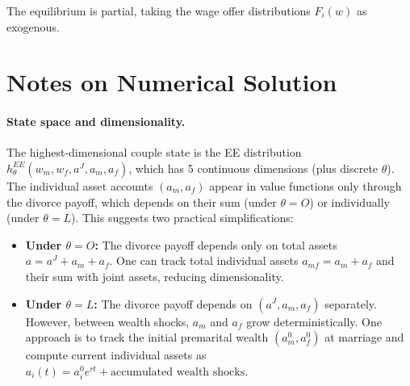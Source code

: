 \documentclass[11pt]{article}
\newcommand{\aJ}{a^{J}}
\begin{document}
The equilibrium is partial, taking the wage offer distributions $F_i(w)$ as exogenous.


\section{Notes on Numerical Solution}

\paragraph{State space and dimensionality.} The highest-dimensional couple state is the EE distribution $h_\theta^{EE}(w_m, w_f, \aJ, a_m, a_f)$, which has 5 continuous dimensions (plus discrete $\theta$). The individual asset accounts $(a_m, a_f)$ appear in value functions only through the divorce payoff, which depends on their sum (under $\theta=O$) or individually (under $\theta=L$). This suggests two practical simplifications:
\begin{itemize}
    \item \textbf{Under $\theta = O$:} The divorce payoff depends only on total assets $a = \aJ + a_m + a_f$. One can track total individual assets $a_{mf} = a_m + a_f$ and their sum with joint assets, reducing dimensionality.
    \item \textbf{Under $\theta = L$:} The divorce payoff depends on $(\aJ, a_m, a_f)$ separately. However, between wealth shocks, $a_m$ and $a_f$ grow deterministically. One approach is to track the initial premarital wealth $(a_m^0, a_f^0)$ at marriage and compute current individual assets as $a_i(t) = a_i^0 e^{rt} + \text{accumulated wealth shocks}$.
\end{itemize}
\end{document}
